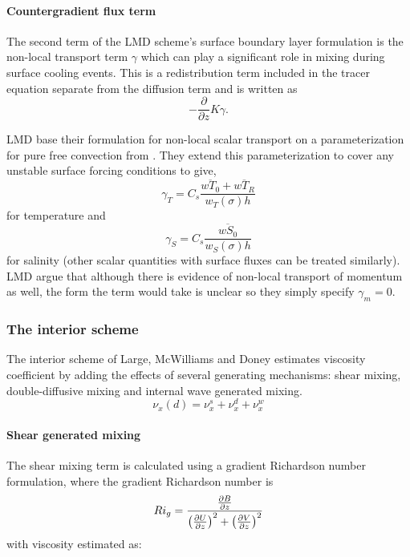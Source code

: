 \paragraph{Countergradient flux term}
The second term of the LMD scheme's surface boundary layer
formulation is the non-local transport term $\gamma$ which can play a
significant role in mixing during surface cooling events.  This is a
redistribution term included in the tracer equation separate from the
diffusion term and is written as 
\begin{equation}
-\frac{\partial}{\partial z}K\gamma.
\end{equation}

LMD base their formulation for non-local scalar transport on a
parameterization for pure free convection from
\cite{Mailhot82}. They extend this parameterization to cover any
unstable surface forcing conditions to give,
\begin{equation}
  \gamma_{T}=C_s\frac{\overline{wT_0}+
  \overline{wT_R}}{w_T(\sigma)h}
\end{equation}
for temperature and 
\begin{equation}
\gamma_S=C_s \frac{\overline{wS_0}}{w_S(\sigma)h}
\end{equation}
for salinity (other scalar quantities with surface fluxes can be
treated similarly). LMD argue that although there is evidence of
non-local transport of momentum as well, the form the term would take
is unclear so they simply specify $\gamma_m=0$.

\subsubsection{The interior scheme}
The interior scheme of Large, McWilliams and Doney estimates viscosity
coefficient by adding the effects of several generating mechanisms:
shear mixing, double-diffusive mixing and internal wave generated
mixing.
\begin{equation}
\nu_{x}(d)=\nu_{x}^s+\nu_{x}^d+\nu_{x}^w
\end{equation}

\paragraph{Shear generated mixing}
The shear mixing term is calculated using a
gradient Richardson number formulation, where the gradient Richardson
number is
\begin{equation}
  Ri_g = { {\partial B \over \partial z} \over
  \left({\partial U \over \partial z}\right)^2 +
  \left({\partial V \over \partial z}\right)^2 }
\end{equation}
with viscosity
estimated as: 

